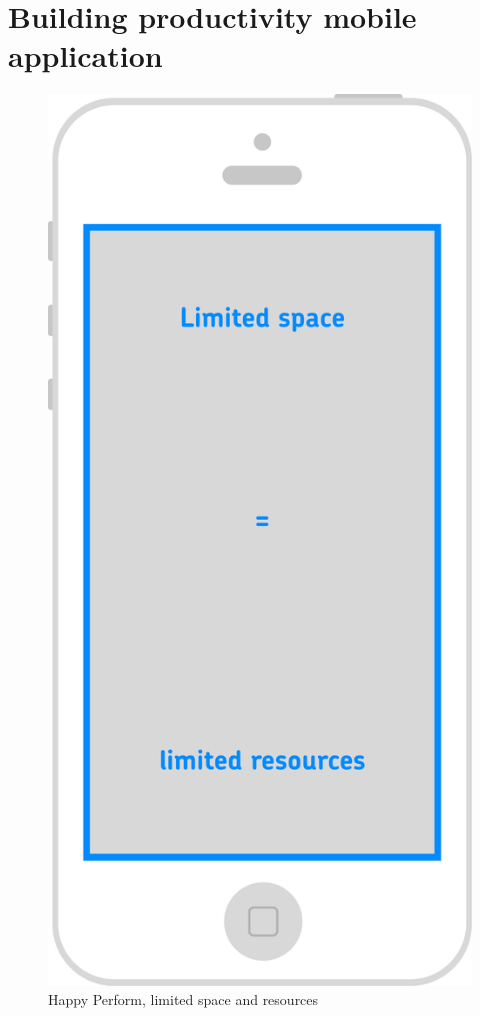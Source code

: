 \chapter{Building productivity mobile application}

\begin{figure}
   \centering
	\includegraphics[width=1\linewidth]{resources/limited-resources.pdf}
	\caption[Happy Perform, limited space and resources]{Happy Perform, limited space and resources}
\end{figure}

